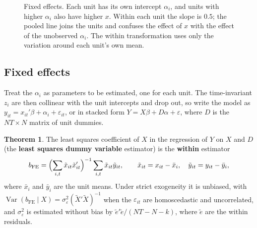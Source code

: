 \documentclass[11pt,a4paper]{article}
\numberwithin{equation}{section}
\DeclareMathOperator{\Var}{Var}
\theoremstyle{definition}
\newtheorem{thm}{Theorem}[subsection]
\begin{document}
\begin{figure}[H]
\centering
{}
\caption{Fixed effects. Each unit has its own intercept $\alpha_i$, and units with higher $\alpha_i$ also have higher $x$. Within each unit the slope is $0.5$; the pooled line
joins the units and confuses the effect of $x$ with the effect of the unobserved $\alpha_i$. The within transformation uses only the variation around
each unit's own mean.}
\label{fig:within}
\end{figure}

\subsection{Fixed effects}
\label{ssec:fe}

Treat the $\alpha_i$ as parameters to be estimated, one for each unit. The time-invariant $z_i$ are then collinear with the unit intercepts and drop out, so
write the model as $y_{it} = x_{it}'\beta + \alpha_i + \varepsilon_{it}$, or in stacked form $Y = X\beta + D\alpha + \varepsilon$, where $D$ is the $NT \times N$ matrix of unit dummies.

\begin{thm}
\label{thm:within}
The least squares coefficient of $X$ in the regression of $Y$ on $X$ and $D$ (the \textbf{least squares dummy variable} estimator) is the \textbf{within}
estimator
\[
b_{\text{FE}} = \Bigl(\sum_{i,t}\tilde x_{it}\tilde x_{it}'\Bigr)^{-1}\sum_{i,t}\tilde x_{it}\tilde y_{it}, \qquad \tilde x_{it} = x_{it} - \bar x_i, \quad \tilde y_{it} = y_{it} - \bar y_i,
\]
where $\bar x_i$ and $\bar y_i$ are the unit means. Under strict exogeneity it is unbiased, with $\Var(b_{\text{FE}} \mid X) = \sigma_\varepsilon^2(\tilde X'\tilde X)^{-1}$ when the $\varepsilon_{it}$ are homoscedastic and
uncorrelated, and $\sigma_\varepsilon^2$ is estimated without bias by $\tilde e'\tilde e/(NT - N - k)$, where $\tilde e$ are the within residuals.
\end{thm}
\end{document}
